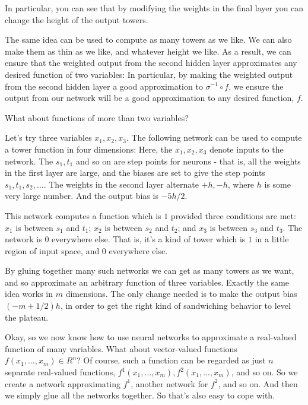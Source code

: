 In particular, you can see that by modifying the weights in the final layer you can change the height of the output towers.


The same idea can be used to compute as many towers as we like. We can also make them as thin as we like, and whatever height we like. As a result, we can ensure that the weighted output from the second hidden layer approximates any desired function of two variables: In particular, by making the weighted output from the second hidden layer a good approximation to $\sigma^{-1} \circ f$, we ensure the output from our network will be a good approximation to any desired function, $f$.


What about functions of more than two variables?


Let's try three variables $x_1, x_2, x_3$. The following network can be used to compute a tower function in four dimensions: Here, the $x_1, x_2, x_3$ denote inputs to the network. The $s_1, t_1$ and so on are step points for neurons - that is, all the weights in the first layer are large, and the biases are set to give the step points $s_1, t_1, s_2, \ldots$. The weights in the second layer alternate $+h, -h$, where $h$ is some very large number. And the output bias is $-5h/2$.


This network computes a function which is $1$ provided three conditions are met: $x_1$ is between $s_1$ and $t_1$; $x_2$ is between $s_2$ and $t_2$; and $x_3$ is between $s_3$ and $t_3$. The network is $0$ everywhere else. That is, it's a kind of tower which is $1$ in a little region of input space, and $0$ everywhere else.


By gluing together many such networks we can get as many towers as we want, and so approximate an arbitrary function of three variables. Exactly the same idea works in $m$ dimensions. The only change needed is to make the output bias $(-m+1/2)h$, in order to get the right kind of sandwiching behavior to level the plateau.


Okay, so we now know how to use neural networks to approximate a real-valued function of many variables. What about vector-valued functions $f(x_1, \ldots, x_m) \in R^n$? Of course, such a function can be regarded as just $n$ separate real-valued functions, $f^1(x_1, \ldots, x_m), f^2(x_1, \ldots, x_m)$, and so on. So we create a network approximating $f^1$, another network for $f^2$, and so on. And then we simply glue all the networks together. So that's also easy to cope with.



